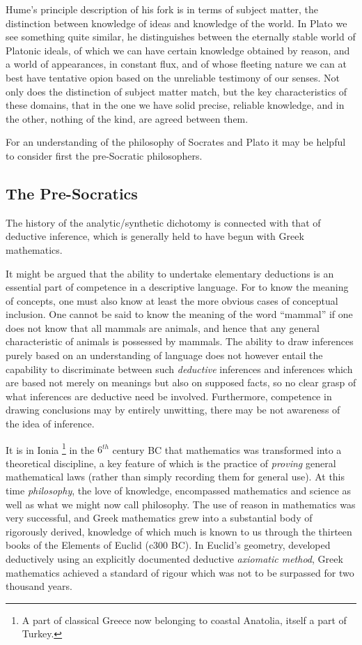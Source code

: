 Hume's principle description of his fork is in terms of subject
matter, the distinction between knowledge of ideas and knowledge of
the world. 
In Plato we see something quite similar, he distinguishes between the
eternally stable world of Platonic ideals, of which we can have
certain knowledge obtained by reason, and a world of appearances, in
constant flux, and of whose fleeting nature we can at best have
tentative opion based on the unreliable testimony of our senses.
Not only does the distinction of subject matter match, but the key
characteristics of these domains, that in the one we have solid
precise, reliable knowledge, and in the other, nothing of the kind,
are agreed between them.

For an understanding of the
philosophy of Socrates and Plato it may be helpful to consider first
the pre-Socratic philosophers.

\subsection{The Pre-Socratics}

The history of the analytic/synthetic dichotomy is connected with that
of deductive inference, which is generally held to have begun with
Greek mathematics.

It might be argued that the ability to undertake elementary
deductions is an essential part of competence in a descriptive
language.
For to know the meaning of concepts, one must also know at least the
more obvious cases of conceptual inclusion.
One cannot be said to know the meaning of the word ``mammal'' if one
does not know that all mammals are animals, and hence that any general
characteristic of animals is possessed by mammals.
The ability to draw inferences purely based on an understanding of
language does not however entail the capability to discriminate
between such \emph{deductive} inferences and inferences which are
based not merely on meanings but also on supposed facts, so no clear
grasp of what inferences are deductive need be involved.
Furthermore, competence in drawing conclusions may by entirely
unwitting, there may be not awareness of the idea of inference.

It is in Ionia%
\footnote{A part of classical Greece now belonging to coastal Anatolia,
  itself a part of Turkey.}%
 in the $6^{th}$ century BC that mathematics was transformed into a
 theoretical discipline, a key feature of which is the practice of
 \emph{proving} general mathematical laws (rather than simply
 recording them for general use).
At this time \emph{philosophy}, the love of knowledge, encompassed
mathematics and science as well as what we might now call philosophy.
The use of reason in mathematics was very successful, and Greek
mathematics grew into a substantial body of rigorously derived,
knowledge of which much is known to us through the thirteen books of
the Elements of Euclid (c300 BC). 
In Euclid's geometry, developed deductively using an explicitly
documented deductive \emph{axiomatic method},
Greek mathematics achieved a standard of rigour which was not to be
surpassed for two thousand years.

